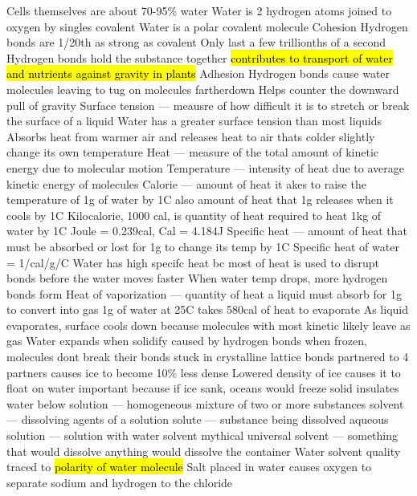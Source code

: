 \documentclass[../main.tex]{subfiles}
\begin{document}
\begin{outline}
	\1 Cells themselves are about 70-95\% water
	\1 Water is 2 hydrogen atoms joined to oxygen by singles covalent
	\1 Water is a polar covalent molecule
	\1 Cohesion
	\2 Hydrogen bonds are 1/20th as strong as covalent
	\3 Only last a few trillionths of a second
	\2 Hydrogen bonds hold the substance together
	\2 \hl{contributes to transport of water and nutrients against gravity in plants}
	\1 Adhesion
	\2 Hydrogen bonds cause water molecules leaving to tug on molecules fartherdown
	\2 Helps counter the downward pull of gravity
	\1 Surface tension --- meausre of how difficult it is to stretch or break the surface of a liquid
	\2 Water has a greater surface tension than most liquids
	\1 Absorbs heat from warmer air and releases heat to air thats colder
	\2 slightly change its own temperature
	\1 Heat --- measure of the total amount of kinetic energy due to molecular motion
	\1 Temperature --- intensity of heat due to average kinetic energy of molecules
	\1 Calorie --- amount of heat it akes to raise the temperature of 1g of water by 1C
	\2 also amount of heat that 1g releases when it cools by 1C
	\1 Kilocalorie, 1000 cal, is quantity of heat required to heat 1kg of water by 1C
	\1 Joule = 0.239cal, Cal = 4.184J
	\1 Specific heat --- amount of heat that must be absorbed or lost for 1g to change its temp by 1C
	\2 Specific heat of water = 1/cal/g/C
	\1 Water has high specifc heat bc most of heat is used to disrupt bonds before the water moves faster
	\2 When water temp drops, more hydrogen bonds form
	\1 Heat of vaporization --- quantity of heat a liquid must absorb for 1g to convert into gas
	\2 1g of water at 25C takes 580cal of heat to evaporate
	\1 As liquid evaporates, surface cools down because molecules with most kinetic likely leave as gas
	\1 Water expands when solidify
	\2 caused by hydrogen bonds
	\2 when frozen, molecules dont break their bonds
	\2 stuck in crystalline lattice
	\3 bonds partnered to 4 partners
	\2 causes ice to become 10\% less dense
	\1 Lowered density of ice causes it to float on water
	\2 important because if ice sank, oceans would freeze solid
	\2 insulates water below
	\1 solution --- homogeneous mixture of two or more substances
	\1 solvent --- dissolving agents of a solution
	\1 solute --- substance being dissolved
	\1 aqueous solution --- solution with water solvent
	\1 mythical universal solvent --- something that would dissolve anything
	\2 would dissolve the container
	\1 Water solvent quality traced to \hl{polarity of water molecule}
	\2 Salt placed in water causes oxygen to separate sodium and hydrogen to the chloride

\end{outline}
\end{document}
